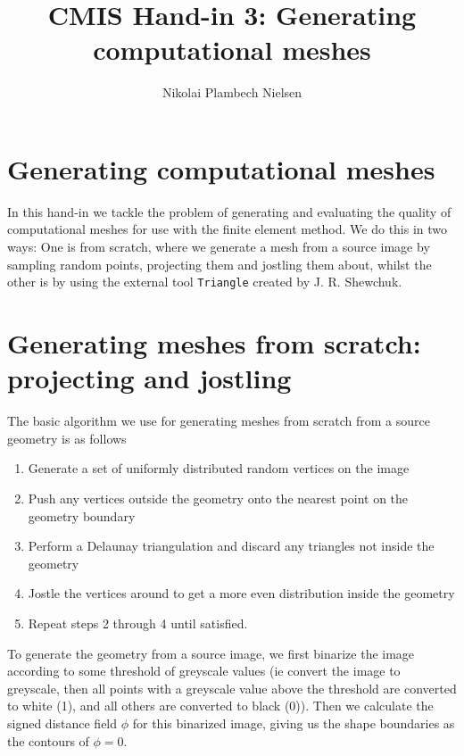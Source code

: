 \documentclass[sigconf]{acmart}
\begin{document}
%
\title{CMIS Hand-in 3: Generating computational meshes}

\author{Nikolai Plambech Nielsen}


\maketitle

\section{Generating computational meshes}
In this hand-in we tackle the problem of generating and evaluating the quality of computational meshes for use with the finite element method. We do this in two ways: One is from scratch, where we generate a mesh from a source image by sampling random points, projecting them and jostling them about, whilst the other is by using the external tool \texttt{Triangle} created by J. R. Shewchuk.



\section{Generating meshes from scratch: projecting and jostling}
The basic algorithm we use for generating meshes from scratch from a source geometry is as follows
\begin{enumerate}
	\item Generate a set of uniformly distributed random vertices on the image
	\item Push any vertices outside the geometry onto the nearest point on the geometry boundary
	\item Perform a Delaunay triangulation and discard any triangles not inside the geometry
	\item Jostle the vertices around to get a more even distribution inside the geometry
	\item Repeat steps 2 through 4 until satisfied.
\end{enumerate}
To generate the geometry from a source image, we first binarize the image according to some threshold of greyscale values (ie convert the image to greyscale, then all points with a greyscale value above the threshold are converted to white (1), and all others are converted to black (0)). Then we calculate the signed distance field $ \phi $ for this binarized image, giving us the shape boundaries as the contours of $ \phi = 0 $.
\end{document}
